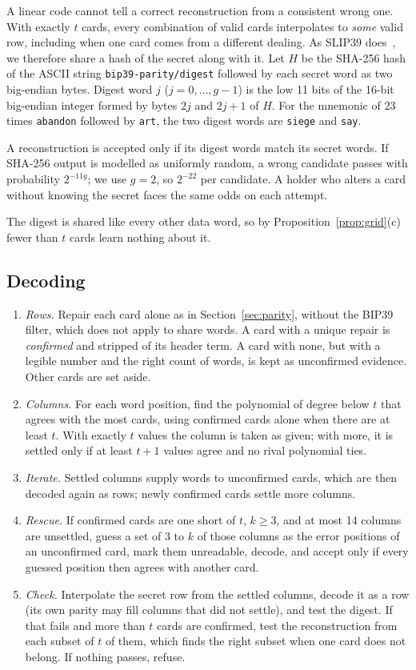 \documentclass[numeric]{anvil-paper}
\newcommand{\code}[1]{\texttt{#1}}
\begin{document}
A linear code cannot tell a correct reconstruction from a consistent wrong one.
With exactly $t$ cards, every combination of valid cards interpolates to
\emph{some} valid row, including when one card comes from a different dealing.
As SLIP39 does~\citep{slip39}, we therefore share a hash of the secret along
with it. Let $H$ be the SHA-256 hash of the ASCII string
\code{bip39-parity/digest} followed by each secret word as two big-endian
bytes. Digest word $j$ ($j=0,\dots,g-1$) is the low 11 bits of the 16-bit
big-endian integer formed by bytes $2j$ and $2j+1$ of $H$. For the mnemonic of
23 times \code{abandon} followed by \code{art}, the two digest words are
\code{siege} and \code{say}.

A reconstruction is accepted only if its digest words match its secret words.
If SHA-256 output is modelled as uniformly random, a wrong candidate passes
with probability $2^{-11g}$; we use $g=2$, so $2^{-22}$ per candidate. A holder
who alters a card without knowing the secret faces the same odds on each
attempt.

The digest is shared like every other data word, so by
Proposition~\ref{prop:grid}(c) fewer than $t$ cards learn nothing about it.

\subsection{Decoding}
\label{sec:decoder}

\begin{enumerate}
\item \emph{Rows.} Repair each card alone as in Section~\ref{sec:parity},
  without the BIP39 filter, which does not apply to share words. A card with a
  unique repair is \emph{confirmed} and stripped of its header term. A card
  with none, but with a legible number and the right count of words, is kept
  as unconfirmed evidence. Other cards are set aside.
\item \emph{Columns.} For each word position, find the polynomial of degree
  below $t$ that agrees with the most cards, using confirmed cards alone when
  there are at least $t$. With exactly $t$ values the column is taken as given;
  with more, it is settled only if at least $t+1$ values agree and no rival
  polynomial ties.
\item \emph{Iterate.} Settled columns supply words to unconfirmed cards, which
  are then decoded again as rows; newly confirmed cards settle more columns.
\item \emph{Rescue.} If confirmed cards are one short of $t$, $k\ge 3$, and at
  most 14 columns are unsettled, guess a set of 3 to $k$ of those columns as
  the error positions of an unconfirmed card, mark them unreadable, decode, and
  accept only if every guessed position then agrees with another card.
\item \emph{Check.} Interpolate the secret row from the settled columns, decode
  it as a row (its own parity may fill columns that did not settle), and test
  the digest. If that fails and more than $t$ cards are confirmed, test the
  reconstruction from each subset of $t$ of them, which finds the right
  subset when one card does not belong. If nothing passes, refuse.
\end{enumerate}
\end{document}
